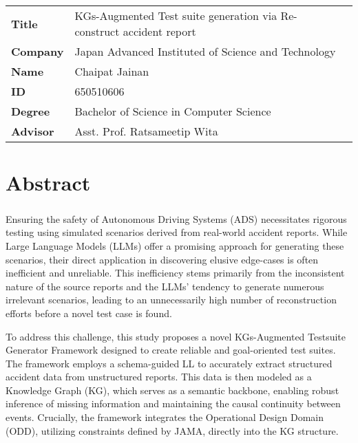 \documentclass[a4paper,12pt]{report}
\begin{document}
\newpage
{
\cleardoublepage%
\let\clearpage\relax%
\noindent
\begin{tabular}{l l c}
    \textbf{Title} & KGs-Augmented Test suite generation via Re-construct accident report & \vspace{0.2cm}\\
    \textbf{Company} & Japan Advanced Instituted of Science and Technology & \vspace{0.2cm}\\
    \textbf{Name} & Chaipat Jainan & \vspace{0.2cm}\\
    \textbf{ID} & 650510606 & \vspace{0.2cm}\\
    \textbf{Degree} & Bachelor of Science in Computer Science & \vspace{0.2cm}\\
    \textbf{Advisor} & Asst. Prof. Ratsameetip Wita & \vspace{0.2cm}\\
\end{tabular}

\chapter*{Abstract}

\paragraph{}
Ensuring the safety of Autonomous Driving Systems (ADS) necessitates rigorous testing using simulated scenarios derived from real-world accident reports. While Large Language Models (LLMs) offer a promising approach for generating these scenarios, their direct application in discovering elusive edge-cases is often inefficient and unreliable. This inefficiency stems primarily from the inconsistent nature of the source reports and the LLMs' tendency to generate numerous irrelevant scenarios, leading to an unnecessarily high number of reconstruction efforts before a novel test case is found.

To address this challenge, this study proposes a novel KGs-Augmented Testsuite Generator Framework designed to create reliable and goal-oriented test suites. The framework employs a schema-guided LL to accurately extract structured accident data from unstructured reports. This data is then modeled as a Knowledge Graph (KG), which serves as a semantic backbone, enabling robust inference of missing information and maintaining the causal continuity between events. Crucially, the framework integrates the Operational Design Domain (ODD), utilizing constraints defined by JAMA, directly into the KG structure.

}
\end{document}
